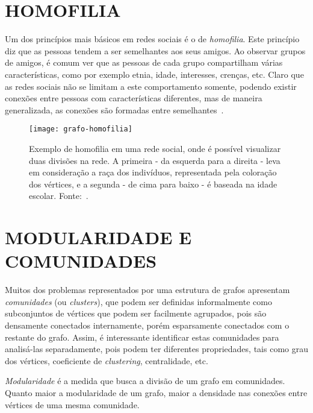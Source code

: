 \section{\texorpdfstring{\MakeUppercase{Homofilia}}{}}
\label{conceitos__homofilia}

Um dos princípios mais básicos em redes sociais é o de \emph{homofilia}. Este princípio diz que as pessoas tendem a ser semelhantes aos seus amigos. Ao observar grupos de amigos, é comum ver que as pessoas de cada grupo compartilham várias características, como por exemplo etnia, idade, interesses, crenças, etc. Claro que as redes sociais não se limitam a este comportamento somente, podendo existir conexões entre pessoas com características diferentes, mas de maneira generalizada, as conexões são formadas entre semelhantes~\cite{easley2010networks}.

\begin{figure}[H]
\texttt{[image: grafo-homofilia]}
\centering
\caption{
     Exemplo de homofilia em uma rede social, onde é possível visualizar duas divisões na rede. A primeira - da esquerda para a direita - leva em consideração a raça dos indivíduos, representada pela coloração dos vértices, e a segunda - de cima para baixo - é baseada na idade escolar. Fonte:~\cite{moody2001race}.
}
\label{fig:grafo-homofilia}
\end{figure}

\section{\texorpdfstring{\MakeUppercase{Modularidade e Comunidades}}{}}
\label{conceitos__modularidade}

Muitos dos problemas representados por uma estrutura de grafos apresentam \emph{comunidades} (ou \emph{clusters}), que podem ser definidas informalmente como subconjuntos de vértices que podem ser facilmente agrupados, pois são densamente conectados internamente, porém esparsamente conectados com o restante do grafo. Assim, é interessante identificar estas comunidades para analisá-las separadamente, pois podem ter diferentes propriedades, tais como grau dos vértices, coeficiente de \emph{clustering}, centralidade, etc. 

\emph{Modularidade} é a medida que busca a divisão de um grafo em comunidades. Quanto maior a modularidade de um grafo, maior a densidade nas conexões entre vértices de uma mesma comunidade.

